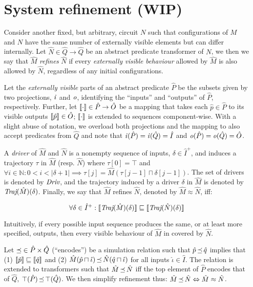 \section{System refinement (WIP)}

Consider another fixed, but arbitrary, circuit $N$ such that configurations of $M$ and $N$ have the same number of externally visible elements but can differ internally. Let $\hat N \in \hat Q \rightarrow \hat Q$ be an abstract predicate transformer of $N$, we then we say that $\hat M$ \textit{refines} $\hat N$ if every \textit{externally visible behaviour} allowed by $\hat M$ is also allowed by $\hat N$, regardless of any initial configurations.

Let the \textit{externally visible} parts of an abstract predicate $\hat P$ be the subsets given by two projections, $\operatorname{\mathit{i}}$ and $\mathit{o}$, identifying the ``inputs'' and ``outputs'' of $\hat P$, respectively. Further, let $\llbracket\cdot\rrbracket \in \hat P \rightarrow \hat O$ be a mapping that takes each $\hat p \in \hat P$ to its visible outputs $\llbracket\hat p\rrbracket \in \hat O$; $\llbracket\cdot\rrbracket$ is extended to sequences component-wise. With a slight abuse of notation, we overload both projections and the mapping to also accept predicates from $\hat Q$ and note that $\operatorname{\mathit{i}}(\hat P) = \operatorname{\mathit{i}}(\hat Q) = \hat I$ and $\mathit{o}(\hat P) = \mathit{o}(\hat Q) = \hat O$.


A \textit{driver} of $\hat M$ and $\hat N$ is a nonempty sequence of inputs, $\delta \in \hat I^{+}$, and induces a trajectory $\tau$ in $\hat M$ (resp. $\hat N$) where $\tau[0] = \top$ and $\forall i \in \mathbb{N} : 0 < i < | \delta + 1 | \implies \tau[j] = \hat M(\tau[j-1] \sqcap \delta[j-1])$. The set of drivers is denoted by $\operatorname{\textit{Driv}}$, and the trajectory induced by a driver $\delta$ in $\hat M$ is denoted by $\operatorname{\textit{Traj}}(\hat M)(\delta)$. Finally, we say that $\hat M$ refines $\hat N$, denoted by $\hat M \approx \hat N$, iff:

\begin{equation*}
\forall \delta \in \hat I^{+} : \llbracket\operatorname{\textit{Traj}}(\hat M)(\delta)\rrbracket \sqsubseteq \llbracket\operatorname{\textit{Traj}}(\hat N)(\delta)\rrbracket
\end{equation*}

\noindent Intuitively, if every possible input sequence produces the same, or at least more specified, outputs, then every visible behaviour of $\hat M$ in covered by $\hat N$.

Let $\operatorname{\preceq} \in \hat P \times \hat Q$ (``encodes'') be a simulation relation such that $\hat p \operatorname{\preceq} \hat q$ implies that (1) $\llbracket\hat p\rrbracket \sqsubseteq \llbracket\hat q\rrbracket$ and (2) $\hat M(\hat p \sqcap \hat \iota) \operatorname{\preceq} \hat N(\hat q \sqcap \hat \iota)$ for all inputs $\hat \iota \in \hat I$. The relation is extended to transformers such that $\hat M \operatorname{\preceq} \hat N$ iff the top element of $\hat P$ encodes that of $\hat Q$, $\top(\hat P) \operatorname{\preceq} \top(\hat Q)$. We then simplify refinement thus: $\hat M \operatorname{\preceq} \hat N \Leftrightarrow \hat M \approx \hat N$.


